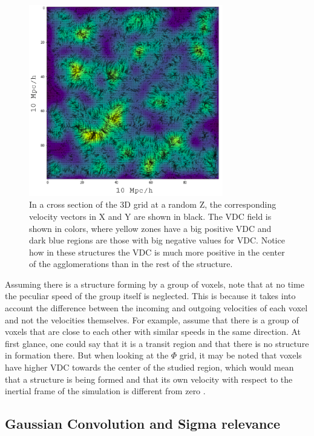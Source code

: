 \documentclass[a4paper,fleqn,usenatbib]{mnras}
\begin{document}
\begin{figure}
    \centering
    \includegraphics[width=240pt]{gauss.png}
    \caption{In a cross section of the 3D grid at a random Z, the corresponding  velocity vectors in X and Y are shown in black. The VDC field is shown in colors, where yellow zones have a big positive VDC and dark blue regions are those with big negative values for VDC. Notice how in these structures the VDC is much more positive in the center of the agglomerations than in the rest of the structure.}
    \label{fig:2D_VDC}
\end{figure}

Assuming there is a structure forming by a group of voxels, note that at no time the peculiar speed of the group itself is neglected. This is because it takes into account the difference between the incoming and outgoing velocities of each voxel and not the velocities themselves. For example, assume that there is a group of voxels that are close to each other with similar speeds in the same direction. At first glance, one could say that it is a transit region and that there is no structure in formation there. But when looking at the $\Phi$ grid, it may be noted that voxels have higher VDC towards the center of the studied region, which would mean that a structure is being formed and that its own velocity with respect to the inertial frame of the simulation is different from zero .


\subsection{Gaussian Convolution and Sigma relevance}
\end{document}
